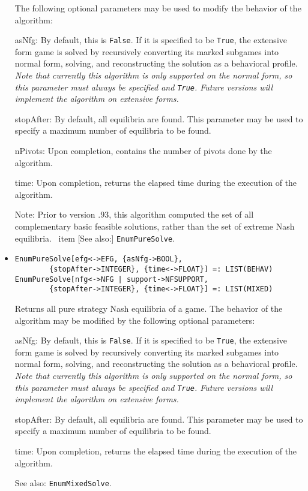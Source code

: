 \begin{itemize}
The following optional parameters may be used to modify the behavior
of the algorithm:
\bd
\item
[asNfg:] By default, this is \verb+False+.  If it is specified to be
\verb+True+, the extensive form game is solved by recursively converting
its marked subgames into normal form, solving, and reconstructing the
solution as a behavioral profile.  {\it Note that currently this algorithm
is only supported on the normal form, so this parameter
must always be specified and {\tt True}.  Future versions will implement
the algorithm on extensive forms.}
\item
[stopAfter:] By default, all equilibria are found.  This parameter may
be used to specify a maximum number of equilibria to be found.
\item
[nPivots:] Upon completion, contains the number of pivots done by the
algorithm.
\item
[time:] Upon completion, returns the elapsed time during the execution
of the algorithm.
\ed
\item
[Note:] Prior to version .93, this algorithm computed the set of all
complementary basic feasible solutions, rather than the set of extreme
Nash equilibria.  \
item
[See also:] {\tt EnumPureSolve}.
\ed

\item
\protect \large \begin{verbatim}
EnumPureSolve[efg<->EFG, {asNfg->BOOL},
        {stopAfter->INTEGER}, {time<->FLOAT}] =: LIST(BEHAV)
EnumPureSolve[nfg<->NFG | support->NFSUPPORT,
        {stopAfter->INTEGER}, {time<->FLOAT}] =: LIST(MIXED) 
\end{verbatim}\normalsize

\bd
Returns all pure strategy Nash equilibria of a game.  The behavior
of the algorithm may be modified by the following optional parameters:
\bd
\item
[asNfg:] By default, this is \verb+False+.  If it is specified to be
\verb+True+, the extensive form game is solved by recursively converting
its marked subgames into normal form, solving, and reconstructing the
solution as a behavioral profile.  {\it Note that currently this algorithm
is only supported on the normal form, so this parameter
must always be specified and {\tt True}.  Future versions will implement
the algorithm on extensive forms.}
\item
[stopAfter:] By default, all equilibria are found.  This parameter may
be used to specify a maximum number of equilibria to be found.
\item
[time:] Upon completion, returns the elapsed time during the execution
of the algorithm.
\ed
\item
[See also:] {\tt EnumMixedSolve}.
\ed


\end{itemize}
